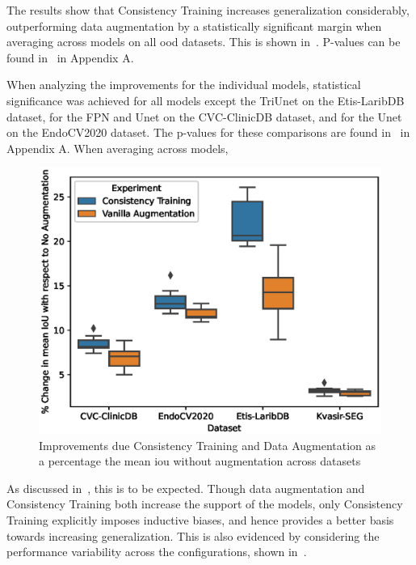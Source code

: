 The results show that Consistency Training increases generalization considerably, outperforming data augmentation by a statistically significant margin when averaging across models on all \gls{ood} datasets. This is shown in~. P-values can be found in~ in Appendix A. 

When analyzing the improvements for the individual models, statistical significance was achieved for all models except the TriUnet on the Etis-LaribDB dataset, for the FPN and Unet on the CVC-ClinicDB dataset, and for the Unet on the EndoCV2020 dataset. The p-values for these comparisons are found in~ in Appendix A. When averaging across models, 
\begin{figure}[htb]
    \centering
    \includegraphics[width=\linewidth]{illustrations/consistency_training_percent.eps}
    \caption[Consistency Training improvements]{Improvements due Consistency Training and Data Augmentation as a percentage the mean \gls{iou} without augmentation across datasets}
    \label{fig:consistency_training_improvement}
\end{figure}

As discussed in~, this is to be expected. Though data augmentation and Consistency Training both increase the support of the models, only Consistency Training explicitly imposes inductive biases, and hence provides a better basis towards increasing generalization. This is also evidenced by considering the performance variability across the configurations,  shown in~.

